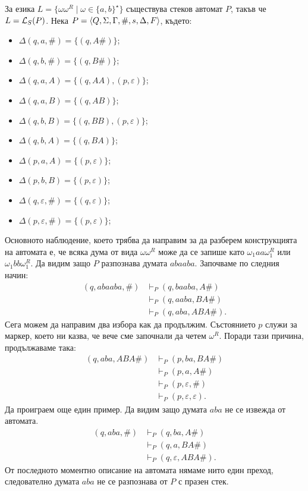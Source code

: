 \begin{example}
  За езика $L = \{\omega\omega^R \mid \omega \in \{a,b\}^\star\}$ съществува стеков автомат $P$, такъв че
  $L = \mathcal{L}_S(P)$.
  Нека $P = \langle{Q,\Sigma,\Gamma,\#,s,\Delta,F}\rangle$, където:
  \begin{itemize}
  \item 
    $\Delta(q, a, \#) = \{(q, A\#)\}$;
  \item 
    $\Delta(q, b, \#) = \{(q, B\#)\}$;
  \item
    $\Delta(q, a, A) = \{(q, AA), (p, \varepsilon)\}$;
  \item
    $\Delta(q, a, B) = \{(q, AB)\}$;
  \item
    $\Delta(q, b, B) = \{(q, BB), (p, \varepsilon)\}$;
  \item
    $\Delta(q, b, A) = \{(q, BA)\}$;
  \item
    $\Delta(p, a, A) = \{(p,\varepsilon)\}$;
  \item
    $\Delta(p, b, B) = \{(p,\varepsilon)\}$;
  \item
    $\Delta(q, \varepsilon, \#) = \{(q,\varepsilon)\}$;
  \item
    $\Delta(p, \varepsilon, \#) = \{(p,\varepsilon)\}$;
  \end{itemize}
  Основното наблюдение, което трябва да направим за да разберем конструкцията на автомата е, че
  всяка дума от вида $\omega\omega^R$ може да се запише като $\omega_1aa\omega^R_1$ или $\omega_1bb\omega^R_1$.
  Да видим защо $P$ разпознава думата $abaaba$.
  Започваме по следния начин:
  \begin{align*}
    (q,abaaba,\#) & \vdash_P (q,baaba,A\#)\\
    & \vdash_P (q, aaba, BA\#) \\
    & \vdash_P (q, aba, ABA\#).
  \end{align*}
  Сега можем да направим два избора как да продължим. Състоянието $p$ служи за маркер, което ни казва, че вече сме започнали 
  да четем $\omega^R$. Поради тази причина, продължаваме така:
  \begin{align*}
    (q, aba, ABA\#) & \vdash_P (p, ba, BA\#)\\
    & \vdash_P (p, a, A\#)\\
    & \vdash_P (p, \varepsilon, \#) \\
    & \vdash_P (p,\varepsilon,\varepsilon).
  \end{align*}
  Да проиграем още един пример. Да видим защо думата $aba$ не се извежда от автомата.
  \begin{align*}
    (q,aba,\#) & \vdash_P (q, ba,A\#)\\
    & \vdash_P (q, a, BA\#)\\
    & \vdash_P (q, \varepsilon, ABA\#).
  \end{align*}
  От последното моментно описание на автомата нямаме нито един преход, следователно
  думата $aba$ не се разпознава от $P$ с празен стек.
\end{example}


